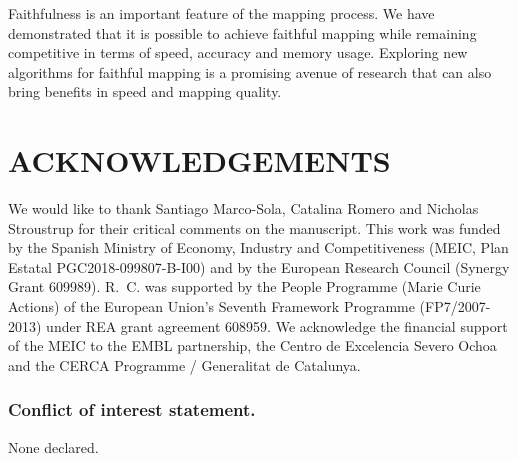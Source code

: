 \documentclass[a4,center,fleqn]{NAR}
\begin{document}
Faithfulness is an important feature of the mapping process. We have
demonstrated that it is possible to achieve faithful mapping while
remaining competitive in terms of speed, accuracy and memory usage.
Exploring new algorithms for faithful mapping is a promising avenue of
research that can also bring benefits in speed and mapping quality.


\section{ACKNOWLEDGEMENTS}

We would like to thank Santiago Marco-Sola, Catalina Romero and Nicholas
Stroustrup for their critical comments on the manuscript.
This work was funded by the Spanish Ministry of Economy, Industry and
Competitiveness (MEIC, Plan Estatal PGC2018-099807-B-I00) and by the
European Research Council (Synergy Grant 609989). R.~C. was supported by
the People Programme (Marie Curie Actions) of the European Union's Seventh
Framework Programme (FP7/2007-2013) under REA grant agreement 608959. We
acknowledge the financial support of the MEIC to the EMBL partnership, the
Centro de Excelencia Severo Ochoa and the CERCA Programme / Generalitat de
Catalunya.




\subsubsection{Conflict of interest statement.} None declared.
\newpage




%
%
%
%
%
\end{document}
